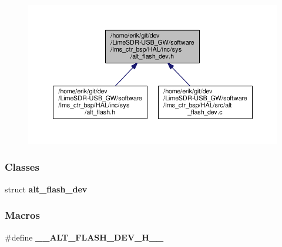 \begin{figure}[H]
\begin{center}
\leavevmode
\includegraphics[width=350pt]{d3/d55/alt__flash__dev_8h__dep__incl}
\end{center}
\end{figure}
\subsubsection*{Classes}
\begin{DoxyCompactItemize}
\item 
struct {\bf alt\+\_\+flash\+\_\+dev}
\end{DoxyCompactItemize}
\subsubsection*{Macros}
\begin{DoxyCompactItemize}
\item 
\#define {\bf \+\_\+\+\_\+\+A\+L\+T\+\_\+\+F\+L\+A\+S\+H\+\_\+\+D\+E\+V\+\_\+\+H\+\_\+\+\_\+}
\end{DoxyCompactItemize}
